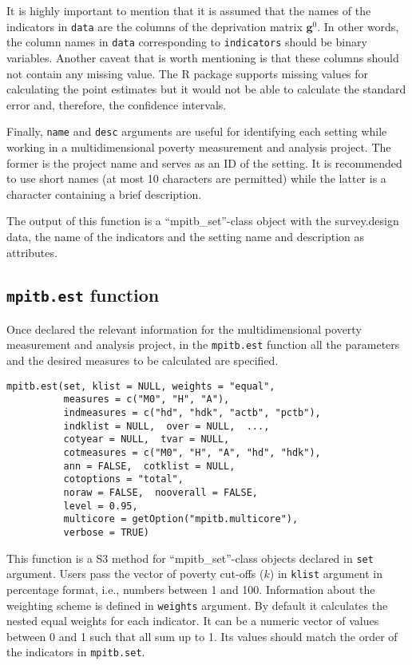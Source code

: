 It is highly important to mention that it is assumed that the names of
the indicators in \texttt{data} are the columns of the deprivation matrix
\(\mathbf{g}^0\). In other words, the column names in \texttt{data} corresponding
to \texttt{indicators} should be binary variables. Another caveat that is worth
mentioning is that these columns should not contain any missing value.
The R  package supports missing values for calculating the
point estimates but it would not be able to calculate the standard error
and, therefore, the confidence intervals.

Finally, \texttt{name} and \texttt{desc} arguments are useful for identifying each
setting while working in a multidimensional poverty measurement and
analysis project. The former is the project name and serves as an ID of
the setting. It is recommended to use short names (at most 10 characters
are permitted) while the latter is a character containing a brief
description.

The output of this function is a ``mpitb\_set''-class object with the
survey.design data, the name of the indicators and the setting name and
description as attributes.

\hypertarget{mpitb.est-function}{%
\subsection{\texorpdfstring{\texttt{mpitb.est} function}{mpitb.est function}}\label{mpitb.est-function}}

Once declared the relevant information for the multidimensional poverty
measurement and analysis project, in the \texttt{mpitb.est} function all the
parameters and the desired measures to be calculated are specified.

\begin{verbatim}
mpitb.est(set, klist = NULL, weights = "equal",
          measures = c("M0", "H", "A"), 
          indmeasures = c("hd", "hdk", "actb", "pctb"),
          indklist = NULL,  over = NULL,  ...,  
          cotyear = NULL,  tvar = NULL,  
          cotmeasures = c("M0", "H", "A", "hd", "hdk"), 
          ann = FALSE,  cotklist = NULL,  
          cotoptions = "total", 
          noraw = FALSE,  nooverall = FALSE, 
          level = 0.95,  
          multicore = getOption("mpitb.multicore"),
          verbose = TRUE)
\end{verbatim}

This function is a S3 method for ``mpitb\_set''-class objects declared in
\texttt{set} argument. Users pass the vector of poverty cut-offs (\(k\)) in \texttt{klist} argument in
percentage format, i.e., numbers between 1 and 100. Information about
the weighting scheme is defined in \texttt{weights} argument. By default it
calculates the nested equal weights for each indicator. It can be a
numeric vector of values between 0 and 1 such that all sum up to 1. Its
values should match the order of the indicators in \texttt{mpitb.set}.

